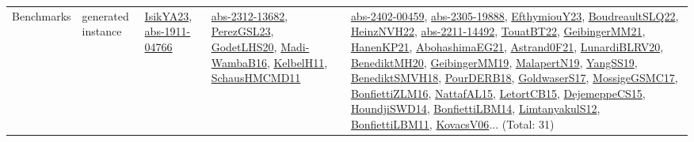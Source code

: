 {\begin{longtable}{lp{3cm}>{\raggedright}p{6cm}>{\raggedright}p{6cm}p{8cm}}
Benchmarks & generated instance & \href{articles/IsikYA23.pdf}{IsikYA23}\cite{IsikYA23}, \href{articles/abs-1911-04766.pdf}{abs-1911-04766}\cite{abs-1911-04766} & \href{articles/abs-2312-13682.pdf}{abs-2312-13682}\cite{abs-2312-13682}, \href{papers/PerezGSL23.pdf}{PerezGSL23}\cite{PerezGSL23}, \href{papers/GodetLHS20.pdf}{GodetLHS20}\cite{GodetLHS20}, \href{papers/Madi-WambaB16.pdf}{Madi-WambaB16}\cite{Madi-WambaB16}, \href{articles/KelbelH11.pdf}{KelbelH11}\cite{KelbelH11}, \href{articles/SchausHMCMD11.pdf}{SchausHMCMD11}\cite{SchausHMCMD11} & \href{articles/abs-2402-00459.pdf}{abs-2402-00459}\cite{abs-2402-00459}, \href{articles/abs-2305-19888.pdf}{abs-2305-19888}\cite{abs-2305-19888}, \href{papers/EfthymiouY23.pdf}{EfthymiouY23}\cite{EfthymiouY23}, \href{papers/BoudreaultSLQ22.pdf}{BoudreaultSLQ22}\cite{BoudreaultSLQ22}, \href{articles/HeinzNVH22.pdf}{HeinzNVH22}\cite{HeinzNVH22}, \href{articles/abs-2211-14492.pdf}{abs-2211-14492}\cite{abs-2211-14492}, \href{papers/TouatBT22.pdf}{TouatBT22}\cite{TouatBT22}, \href{papers/GeibingerMM21.pdf}{GeibingerMM21}\cite{GeibingerMM21}, \href{papers/HanenKP21.pdf}{HanenKP21}\cite{HanenKP21}, \href{articles/AbohashimaEG21.pdf}{AbohashimaEG21}\cite{AbohashimaEG21}, \href{papers/Astrand0F21.pdf}{Astrand0F21}\cite{Astrand0F21}, \href{articles/LunardiBLRV20.pdf}{LunardiBLRV20}\cite{LunardiBLRV20}, \href{articles/BenediktMH20.pdf}{BenediktMH20}\cite{BenediktMH20}, \href{papers/GeibingerMM19.pdf}{GeibingerMM19}\cite{GeibingerMM19}, \href{papers/MalapertN19.pdf}{MalapertN19}\cite{MalapertN19}, \href{papers/YangSS19.pdf}{YangSS19}\cite{YangSS19}, \href{papers/BenediktSMVH18.pdf}{BenediktSMVH18}\cite{BenediktSMVH18}, \href{articles/PourDERB18.pdf}{PourDERB18}\cite{PourDERB18}, \href{papers/GoldwaserS17.pdf}{GoldwaserS17}\cite{GoldwaserS17}, \href{papers/MossigeGSMC17.pdf}{MossigeGSMC17}\cite{MossigeGSMC17}, \href{papers/BonfiettiZLM16.pdf}{BonfiettiZLM16}\cite{BonfiettiZLM16}, \href{articles/NattafAL15.pdf}{NattafAL15}\cite{NattafAL15}, \href{articles/LetortCB15.pdf}{LetortCB15}\cite{LetortCB15}, \href{papers/DejemeppeCS15.pdf}{DejemeppeCS15}\cite{DejemeppeCS15}, \href{papers/HoundjiSWD14.pdf}{HoundjiSWD14}\cite{HoundjiSWD14}, \href{articles/BonfiettiLBM14.pdf}{BonfiettiLBM14}\cite{BonfiettiLBM14}, \href{articles/LimtanyakulS12.pdf}{LimtanyakulS12}\cite{LimtanyakulS12}, \href{papers/BonfiettiLBM11.pdf}{BonfiettiLBM11}\cite{BonfiettiLBM11}, \href{papers/KovacsV06.pdf}{KovacsV06}\cite{KovacsV06}... (Total: 31)\\

\end{longtable}}
